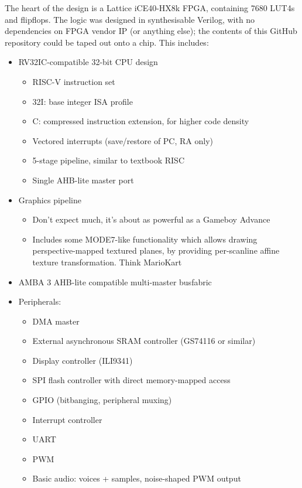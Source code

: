 \documentclass{article}
\begin{document}
The heart of the design is a Lattice iCE40-HX8k FPGA, containing 7680 LUT4s and flipflops. The logic was designed in synthesisable Verilog, with no dependencies on FPGA vendor IP (or anything else); the contents of this GitHub repository could be taped out onto a chip. This includes:

\begin{itemize}
\item RV32IC-compatible 32-bit CPU design
	\begin{itemize}
	\item RISC-V instruction set
	\item 32I: base integer ISA profile
	\item C: compressed instruction extension, for higher code density
	\item Vectored interrupts (save/restore of PC, RA only)
	\item 5-stage pipeline, similar to textbook RISC
	\item Single AHB-lite master port
	\end{itemize}
\item Graphics pipeline
	\begin{itemize}
	\item Don't expect much, it's about as powerful as a Gameboy Advance
	\item Includes some MODE7-like functionality which allows drawing perspective-mapped textured planes, by providing per-scanline affine texture transformation. Think MarioKart
	\end{itemize}
\item AMBA 3 AHB-lite compatible multi-master busfabric
\item Peripherals:
	\begin{itemize}
	\item DMA master
	\item External asynchronous SRAM controller (GS74116 or similar)
	\item Display controller (ILI9341)
	\item SPI flash controller with direct memory-mapped access
	\item GPIO (bitbanging, peripheral muxing)
	\item Interrupt controller
	\item UART
	\item PWM
	\item Basic audio: voices + samples, noise-shaped PWM output
	\end{itemize}
\end{itemize}
\end{document}
